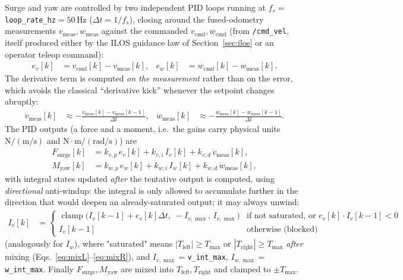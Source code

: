 Surge and yaw are controlled by two independent PID loops running at $f_s=$\texttt{loop\_rate\_hz}$=50$\,Hz ($\Delta t = 1/f_s$), closing around the fused-odometry measurements $v_{\text{meas}}, w_{\text{meas}}$ against the commanded $v_{\text{cmd}}, w_{\text{cmd}}$ (from \texttt{/cmd\_vel}, itself produced either by the ILOS guidance law of Section~\ref{sec:ilos} or an operator teleop command):
\begin{align}
e_v[k] &= v_{\text{cmd}}[k] - v_{\text{meas}}[k], &
e_w[k] &= w_{\text{cmd}}[k] - w_{\text{meas}}[k].
\end{align}
The derivative term is computed \emph{on the measurement} rather than on the error, which avoids the classical ``derivative kick'' whenever the setpoint changes abruptly:
\begin{align}
\dot v_{\text{meas}}[k] &\approx -\frac{v_{\text{meas}}[k]-v_{\text{meas}}[k-1]}{\Delta t}, &
\dot w_{\text{meas}}[k] &\approx -\frac{w_{\text{meas}}[k]-w_{\text{meas}}[k-1]}{\Delta t}.
\end{align}
The PID outputs (a force and a moment, i.e.\ the gains carry physical units $\text{N}/(\text{m/s})$ and $\text{N}\!\cdot\!\text{m}/(\text{rad/s})$) are
\begin{align}
F_{\text{surge}}[k] &= k_{v,p}\,e_v[k] + k_{v,i}\,I_v[k] + k_{v,d}\,\dot v_{\text{meas}}[k], \label{eq:pidF}\\
M_{\text{yaw}}[k]   &= k_{w,p}\,e_w[k] + k_{w,i}\,I_w[k] + k_{w,d}\,\dot w_{\text{meas}}[k], \label{eq:pidM}
\end{align}
with integral states updated \emph{after} the tentative output is computed, using \emph{directional} anti-windup: the integral is only allowed to accumulate further in the direction that would deepen an already-saturated output; it may always unwind:
\begin{align}
I_v[k] &=
\begin{cases}
\operatorname{clamp}\!\big(I_v[k-1] + e_v[k]\Delta t,\; -I_{v,\max},\, I_{v,\max}\big) & \text{if not saturated, or } e_v[k]\cdot I_v[k-1] < 0\\
I_v[k-1] & \text{otherwise (blocked)}
\end{cases}
\end{align}
(analogously for $I_w$), where "saturated" means $|T_{\text{left}}|\!\geq\! T_{\max}$ or $|T_{\text{right}}|\!\geq\! T_{\max}$ \emph{after} mixing (Eqs.~\eqref{eq:mixL}--\eqref{eq:mixR}), and $I_{v,\max}=$\texttt{v\_int\_max}, $I_{w,\max}=$\texttt{w\_int\_max}. Finally $F_{\text{surge}}, M_{\text{yaw}}$ are mixed into $T_{\text{left}}, T_{\text{right}}$ and clamped to $\pm T_{\max}$.

